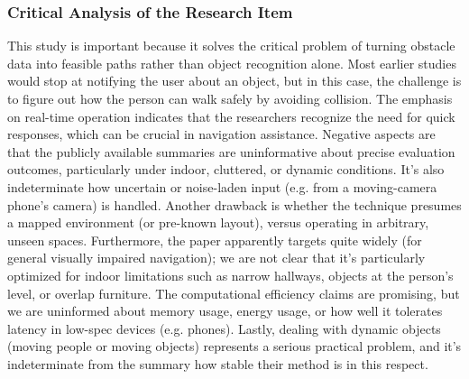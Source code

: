 \documentclass{FastFyp}
\begin{document}
\subsubsection{Critical Analysis of the Research Item}  
This study is important because it solves the critical problem of turning obstacle data into feasible paths rather than object recognition alone. Most earlier studies would stop at notifying the user about an object, but in this case, the challenge is to figure out how the person can walk safely by avoiding collision. The emphasis on real-time operation indicates that the researchers recognize the need for quick responses, which can be crucial in navigation assistance. Negative aspects are that the publicly available summaries are uninformative about precise evaluation outcomes, particularly under indoor, cluttered, or dynamic conditions. It's also indeterminate how uncertain or noise-laden input (e.g. from a moving-camera phone's camera) is handled. Another drawback is whether the technique presumes a mapped environment (or pre-known layout), versus operating in arbitrary, unseen spaces. Furthermore, the paper apparently targets quite widely (for general visually impaired navigation); we are not clear that it's particularly optimized for indoor limitations such as narrow hallways, objects at the person's level, or overlap furniture. The computational efficiency claims are promising, but we are uninformed about memory usage, energy usage, or how well it tolerates latency in low-spec devices (e.g. phones). Lastly, dealing with dynamic objects (moving people or moving objects) represents a serious practical problem, and it's indeterminate from the summary how stable their method is in this respect.
\end{document}
